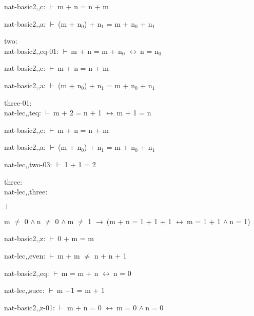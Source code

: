 \documentclass[a4paper]{article}
\newcommand{\Fol}{\mbox{$\vdash\ $}}
\newcommand{\And}{\mbox{$\wedge\ $}}
\newcommand{\Imp}{\mbox{$\rightarrow\ $}}
\newcommand{\Equiv}{\mbox{$\leftrightarrow\ $}}
\begin{document}
nat-basic2,,c: 
 \Fol m + n = n + m



nat-basic2,,a: 
 \Fol (m + $\mbox{n}_{0}$) + $\mbox{n}_{1}$ = m + $\mbox{n}_{0}$ + $\mbox{n}_{1}$



\bigskip

two:\\ nat-basic2,,eq-01: 
 \Fol m + n = m + $\mbox{n}_{0}$ \Equiv n = $\mbox{n}_{0}$



nat-basic2,,c: 
 \Fol m + n = n + m



nat-basic2,,a: 
 \Fol (m + $\mbox{n}_{0}$) + $\mbox{n}_{1}$ = m + $\mbox{n}_{0}$ + $\mbox{n}_{1}$



\bigskip

three-01:\\ nat-lec,,teq: 
 \Fol m + 2 = n + 1 \Equiv m + 1 = n



nat-basic2,,c: 
 \Fol m + n = n + m



nat-basic2,,a: 
 \Fol (m + $\mbox{n}_{0}$) + $\mbox{n}_{1}$ = m + $\mbox{n}_{0}$ + $\mbox{n}_{1}$



nat-lec,,two-03: 
 \Fol 1 + 1 = 2



\bigskip

three:\\ nat-lec,,three: 
\begin{flushleft}


\Fol

m $\neq$ 0 \And n $\neq$ 0 \And m $\neq$ 1 \Imp (m + n = 1 + 1 + 1 \Equiv m = 1 + 1 \And n = 1)

\end{flushleft}

nat-basic2,,z: 
 \Fol 0 + m = m



nat-lec,,even: 
 \Fol m + m $\neq$ n + n + 1



nat-basic2,,eq: 
 \Fol m = m + n \Equiv n = 0



nat-lec,,succ: 
 \Fol m +1 = m + 1



nat-basic2,,z-01: 
 \Fol m + n = 0 \Equiv m = 0 \And n = 0
\end{document}
